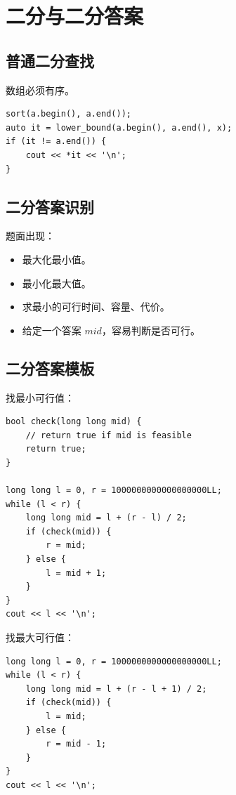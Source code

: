 \section{二分与二分答案}\label{sec:06-17}

\subsection{普通二分查找}

数组必须有序。

\begin{lstlisting}
sort(a.begin(), a.end());
auto it = lower_bound(a.begin(), a.end(), x);
if (it != a.end()) {
    cout << *it << '\n';
}
\end{lstlisting}

\subsection{二分答案识别}

题面出现：

\begin{itemize}
  \item 最大化最小值。
  \item 最小化最大值。
  \item 求最小的可行时间、容量、代价。
  \item 给定一个答案 $mid$，容易判断是否可行。
\end{itemize}

\subsection{二分答案模板}

找最小可行值：

\begin{lstlisting}
bool check(long long mid) {
    // return true if mid is feasible
    return true;
}

long long l = 0, r = 1000000000000000000LL;
while (l < r) {
    long long mid = l + (r - l) / 2;
    if (check(mid)) {
        r = mid;
    } else {
        l = mid + 1;
    }
}
cout << l << '\n';
\end{lstlisting}

找最大可行值：

\begin{lstlisting}
long long l = 0, r = 1000000000000000000LL;
while (l < r) {
    long long mid = l + (r - l + 1) / 2;
    if (check(mid)) {
        l = mid;
    } else {
        r = mid - 1;
    }
}
cout << l << '\n';
\end{lstlisting}

